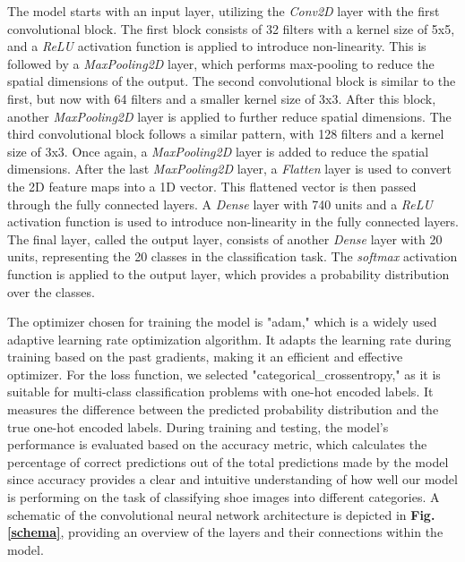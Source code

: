 \documentclass[11pt,a4paper]{article}
\begin{document}
The model starts with an input layer, utilizing the \emph{Conv2D} layer with the first convolutional block. The first block consists of 32 filters with a kernel size of 5x5, and a \emph{ReLU} activation function is applied to introduce non-linearity. This is followed by a \emph{MaxPooling2D} layer, which performs max-pooling to reduce the spatial dimensions of the output. The second convolutional block is similar to the first, but now with 64 filters and a smaller kernel size of 3x3. After this block, another \emph{MaxPooling2D} layer is applied to further reduce spatial dimensions. The third convolutional block follows a similar pattern, with 128 filters and a kernel size of 3x3. Once again, a \emph{MaxPooling2D} layer is added to reduce the spatial dimensions. After the last \emph{MaxPooling2D} layer, a \emph{Flatten} layer is used to convert the 2D feature maps into a 1D vector. This flattened vector is then passed through the fully connected layers. A \emph{Dense} layer with 740 units and a \emph{ReLU} activation function is used to introduce non-linearity in the fully connected layers. The final layer, called the output layer, consists of another \emph{Dense} layer with 20 units, representing the 20 classes in the classification task. The \emph{softmax} activation function is applied to the output layer, which provides a probability distribution over the classes.

The optimizer chosen for training the model is "adam," which is a widely used adaptive learning rate optimization algorithm. It adapts the learning rate during training based on the past gradients, making it an efficient and effective optimizer.
For the loss function, we selected "categorical\_crossentropy," as it is suitable for multi-class classification problems with one-hot encoded labels. It measures the difference between the predicted probability distribution and the true one-hot encoded labels.
During training and testing, the model's performance is evaluated based on the accuracy metric, which calculates the percentage of correct predictions out of the total predictions made by the model since accuracy provides a clear and intuitive understanding of how well our model is performing on the task of classifying shoe images into different categories. A schematic of the convolutional neural network architecture is depicted in \textbf{Fig. \ref{schema}}, providing an overview of the layers and their connections within the model.
\end{document}
